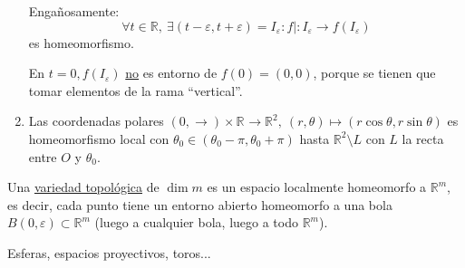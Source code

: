 \begin{ej}[¡Importantes!]
\begin{enumerate}
    Engañosamente: 
    \[
        \forall t \in \mathbb{R},\ \exists \left( t - \varepsilon, t + \varepsilon \right) = I_{\varepsilon}: f| : I_{\varepsilon} \rightarrow f\left( I_{\varepsilon} \right) 
    \]
    es homeomorfismo.

    En $t = 0, f\left( I_{\varepsilon} \right)$ \underline{no} es entorno de $f\left( 0 \right) = \left( 0, 0 \right)$, porque se tienen que tomar elementos de la rama ``vertical''.

    \item Las coordenadas polares $\left( 0, \rightarrow \right) \times \mathbb{R}^{} \rightarrow \mathbb{R}^{2},\ \left( r, \theta \right) \mapsto \left( r\cos \theta, r \sin \theta \right)$ es homeomorfismo local con $\theta_0 \in \left( \theta_0 - \pi, \theta_0 + \pi \right)$ hasta $\mathbb{R}^{2} \setminus L$ con $L$ la recta entre $O$ y $\theta_0$.
\end{enumerate} 
\end{ej}

\begin{defi}
Una \underline{variedad topológica} de $\dim m$ es un espacio localmente homeomorfo a $\mathbb{R}^m$, es decir, cada punto tiene un entorno abierto homeomorfo a una bola $B\left( 0, \varepsilon \right) \subset \mathbb{R}^m$ (luego a cualquier bola, luego a todo $\mathbb{R}^m$).
\end{defi}
\begin{ej}
Esferas, espacios proyectivos, toros...
\end{ej}

